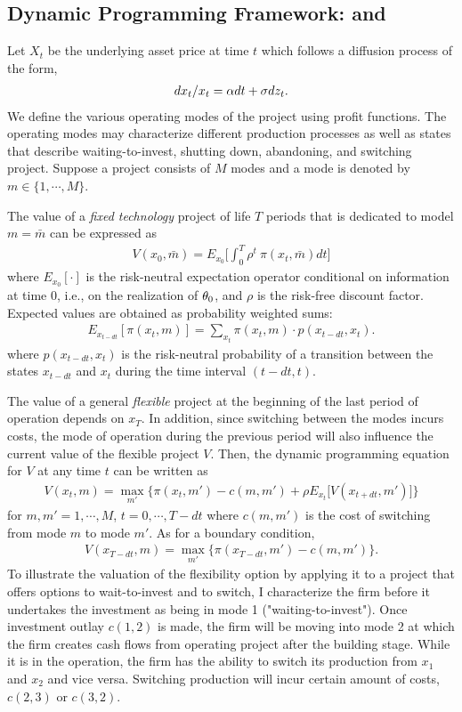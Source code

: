 \documentclass[11pt,letter]{article}
\def\a{\alpha} \def\b{\beta} \def\g{\gamma} \def\d{\delta} \def\r{\rho}
\theoremstyle{definition}
\theoremstyle{remark}
\numberwithin{equation}{section}
\begin{document}
\subsection{Dynamic Programming Framework: \cite{kulatilaka1993value} and \cite{kulatilaka1995operating}}
Let $X_t$ be the underlying asset price at time $t$ which follows a diffusion process of the form,
\begin{align*}
    dx_t/x_t=\a dt+\s dz_t.
\end{align*}
We define the various operating modes of the project using profit functions. The operating modes may characterize different production processes as well as states that describe waiting-to-invest, shutting down, abandoning, and switching project. Suppose a project consists of $M$ modes and a mode is denoted by $m\in\{1,\cdots,M\}$.

The value of a \textit{fixed technology} project of life $T$ periods that is dedicated to model $m=\bar{m}$ can be expressed as
\begin{align*}
    V(x_0,\bar{m})=E_{x_0}\bigg[\int_0^T\rho^t~\pi(x_t,\bar{m})dt\bigg]
\end{align*}
where $E_{x_0}[\cdot]$ is the risk-neutral expectation operator conditional on information at time $0$, i.e., on the realization of $\theta_0$, and $\rho$ is the risk-free discount factor. Expected values are obtained as probability weighted sums:
\begin{align*}
    E_{x_{t-dt}}[\pi(x_t,m)]=\sum_{x_t}\pi(x_t,m)\cdot p(x_{t-dt},x_t).
\end{align*}
where $p(x_{t-dt},x_t)$ is the risk-neutral probability of a transition between the states $x_{t-dt}$ and $x_t$ during the time interval $(t-dt,t)$.

The value of a general \textit{flexible} project at the beginning of the last period of operation depends on $x_T$. In addition, since switching between the modes incurs costs, the mode of operation during the previous period will also influence the current value of the flexible project $V$. Then, the dynamic programming equation for $V$ at any time $t$ can be written as
\begin{align*}
    V(x_t,m)=\max_{m'}\bigg\{\pi(x_t,m')-c(m,m')+\rho E_{x_t}\Big[V(x_{t+dt},m')\Big]\bigg\}
\end{align*}
for $m,m'=1,\cdots,M$, $t=0,\cdots,T-dt$ where $c(m,m')$ is the cost of switching from mode $m$ to mode $m'$. As for a boundary condition,
\begin{align*}
    V(x_{T-dt},m)=\max_{m'}\bigg\{\pi(x_{T-dt},m')-c(m,m')\bigg\}.
\end{align*}
To illustrate the valuation of the flexibility option by applying it to a project that offers options to wait-to-invest and to switch, I characterize the firm before it undertakes the investment as being in mode 1 ("waiting-to-invest"). Once investment outlay $c(1,2)$ is made, the firm will be moving into mode 2 at which the firm creates cash flows from operating project after the building stage. While it is in the operation, the firm has the ability to switch its production from $x_1$ and $x_2$ and vice versa. Switching production will incur certain amount of costs, $c(2,3)$ or $c(3,2)$.
\end{document}
